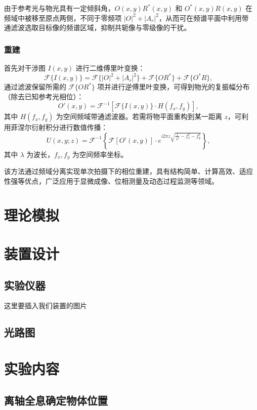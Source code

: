 \documentclass[a4paper]{report}
\begin{document}
由于参考光与物光具有一定倾斜角，$O(x,y) R^*(x,y)$ 和 $O^*(x,y) R(x,y)$ 在频域中被移至原点两侧，不同于零频项 $|O|^2 + |A_r|^2$，从而可在频谱平面中利用带通滤波选取目标像的频谱区域，抑制共轭像与零级像的干扰。
\subsection{重建}
首先对干涉图 $I(x,y)$ 进行二维傅里叶变换：
\begin{equation}
\mathcal{F}\{I(x,y)\} = \mathcal{F}\{|O|^2 + |A_r|^2\} + \mathcal{F}\{O R^*\} + \mathcal{F}\{O^* R\},
\end{equation}
通过滤波保留所需的 $\mathcal{F}\{O R^*\}$ 项并进行逆傅里叶变换，可得到物光的复振幅分布（除去已知参考光相位）：
\begin{equation}
O'(x,y) = \mathcal{F}^{-1} \left[ \mathcal{F}\{I(x,y)\} \cdot H(f_x,f_y) \right],
\end{equation}
其中 $H(f_x,f_y)$ 为空间频域带通滤波器。若需将物平面重构到某一距离 $z$，可利用菲涅尔衍射积分进行数值传播：
\begin{equation}
U(x,y;z) = \mathcal{F}^{-1} \left\{ \mathcal{F}[O'(x,y)] \cdot e^{i 2\pi z \sqrt{\frac{1}{\lambda^2} - f_x^2 - f_y^2}} \right\},
\end{equation}
其中 $\lambda$ 为波长，$f_x,f_y$ 为空间频率坐标。

该方法通过频域分离实现单次拍摄下的相位重建，具有结构简单、计算高效、适应性强等优点，广泛应用于显微成像、位相测量及动态过程监测等领域。

\chapter{理论模拟}

\chapter{装置设计}
\section{实验仪器}
这里要插入我们装置的图片
\section{光路图}

\chapter{实验内容}
\section{离轴全息确定物体位置}
\end{document}
